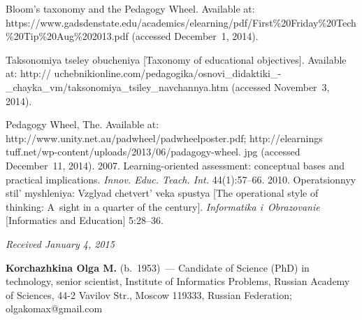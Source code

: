\begin{multicols}{2}
{{\begin{thebibliography}{99}
Bloom's taxonomy and the Pedagogy Wheel. Available at: {\sf
https://www.gadsdenstate.edu/academics/\linebreak elearning/pdf/First\%20Friday\%20Tech\%20Tip\%20Aug\linebreak \%202013.pdf} (accessed December~1, 2014).

 Taksonomiya tseley obucheniya [Taxonomy of educational objectives].
Available at: {\sf http:// uchebnikionline.com/pedagogika/osnovi\_didaktiki\_-\_chayka\_vm/taksonomiya\_tsiley\_navchannya.htm} (accessed November~3, 2014).

Pedagogy Wheel, The. Available at:
{\sf http://www.unity.\linebreak net.au/padwheel/padwheelposter.pdf}; {\sf
http://elearnings tuff.net/wp-content/uploads/2013/06/padagogy-wheel. jpg} (accessed December~11,
2014).
 2007. Learning-oriented assessment: conceptual bases and practical implications.
\textit{Innov. Educ.  Teach. Int.} 44(1):57--66.
 2010. Operatsionnyy stil' myshleniya: Vzglyad chetvert' veka spustya [The
operational style of thinking: A~sight in a quarter of the century]. \textit{Informatika i~Obrazovanie}
[Informatics and Education] 5:28--36.
\end{thebibliography}

 }
 }

\end{multicols}

\vspace*{-3pt}

\hfill{\small\textit{Received January 4, 2015}}


   \Contrl

   \noindent
   \textbf{Korchazhkina Olga M.} (b.\ 1953)~---
   Candidate of Science (PhD) in technology, senior scientist, Institute of Informatics Problems,
Russian Academy of Sciences, 44-2 Vavilov Str., Moscow 119333, Russian Federation;
olgakomax@gmail.com

\label{end\stat}

\renewcommand{\bibname}{\protect\rm Литература}